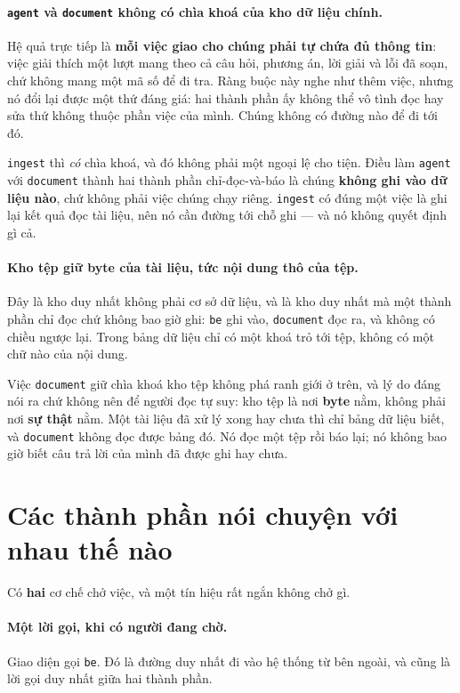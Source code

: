 \paragraph{\texttt{agent} và \texttt{document} không có chìa khoá của kho dữ liệu chính.}
Hệ quả trực tiếp là \textbf{mỗi việc giao cho chúng phải tự chứa đủ thông tin}: việc giải thích
một lượt mang theo cả câu hỏi, phương án, lời giải và lỗi đã soạn, chứ không mang một mã số để
đi tra. Ràng buộc này nghe như thêm việc, nhưng nó đổi lại được một thứ đáng giá: hai thành
phần ấy không thể vô tình đọc hay sửa thứ không thuộc phần việc của mình. Chúng không có
đường nào để đi tới đó.

\texttt{ingest} thì \emph{có} chìa khoá, và đó không phải một ngoại lệ cho tiện. Điều làm
\texttt{agent} với \texttt{document} thành hai thành phần chỉ-đọc-và-báo là chúng \textbf{không
ghi vào dữ liệu nào}, chứ không phải việc chúng chạy riêng. \texttt{ingest} có đúng một việc là
ghi lại kết quả đọc tài liệu, nên nó cần đường tới chỗ ghi --- và nó không quyết định gì cả.

\paragraph{Kho tệp giữ \textbf{byte} của tài liệu, tức nội dung thô của tệp.} Đây là kho
duy nhất không phải cơ sở dữ liệu, và là kho duy nhất mà một thành phần chỉ đọc chứ không
bao giờ ghi: \texttt{be} ghi vào, \texttt{document} đọc ra, và không có chiều ngược lại. Trong
bảng dữ liệu chỉ có một khoá trỏ tới tệp, không có một chữ nào của nội dung.

Việc \texttt{document} giữ chìa khoá kho tệp không phá ranh giới ở trên, và lý do đáng nói ra
chứ không nên để người đọc tự suy: kho tệp là nơi \textbf{byte} nằm, không phải nơi \textbf{sự
thật} nằm. Một tài liệu đã xử lý xong hay chưa thì chỉ bảng dữ liệu biết, và \texttt{document}
không đọc được bảng đó. Nó đọc một tệp rồi báo lại; nó không bao giờ biết câu trả lời của mình
đã được ghi hay chưa.

\section{Các thành phần nói chuyện với nhau thế nào}
\label{sec:noi-chuyen}

Có \textbf{hai} cơ chế chở việc, và một tín hiệu rất ngắn không chở gì.

\paragraph{Một lời gọi, khi có người đang chờ.} Giao diện gọi \texttt{be}. Đó là đường duy nhất
đi vào hệ thống từ bên ngoài, và cũng là lời gọi duy nhất giữa hai thành phần.

